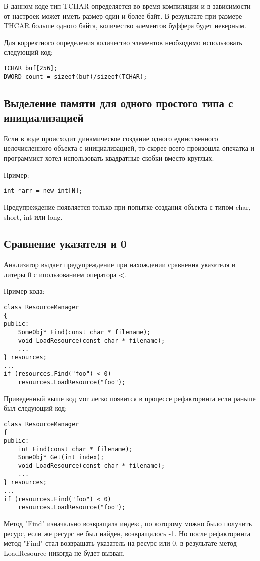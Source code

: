 В данном коде тип TCHAR определяется во время компиляции и в зависимости от настроек
может иметь размер один и более байт. В результате при размере THCAR больше одного байта,
количество элементов буффера будет неверным. 

Для корректного определения количество элементов необходимо использовать следующий код:
\begin{lstlisting}
TCHAR buf[256];
DWORD count = sizeof(buf)/sizeof(TCHAR);
\end{lstlisting}

\subsection{Выделение памяти для одного простого типа с инициализацией}
\label{sec:new}
Если в коде происходит динамическое создание одного единственного целочисленного объекта с
инициализацией, то скорее всего произошла опечатка и программист хотел использовать
квадратные скобки вместо круглых.

Пример:
\begin{lstlisting}
int *arr = new int[N];
\end{lstlisting}

Предупреждение появляется только при попытке создания объекта с типом char, short, int или long.

\subsection{Сравнение указателя и 0}
\label{sec:ptrCmp}
Анализатор выдает предупреждение при нахождении сравнения указателя и литеры 0 с ипользованием 
оператора \textbf{<}.

Пример кода:
\begin{lstlisting}
class ResourceManager
{
public:
	SomeObj* Find(const char * filename);
	void LoadResource(const char * filename);
	...
} resources;
...
if (resources.Find("foo") < 0)
	resources.LoadResource("foo");
\end{lstlisting}
  
Приведенный выше код мог легко появится в процессе рефакторинга если раньше был следующий код: 
\begin{lstlisting}
class ResourceManager
{
public:
	int Find(const char * filename);
	SomeObj* Get(int index);
	void LoadResource(const char * filename);
	...
} resources;
...
if (resources.Find("foo") < 0)
	resources.LoadResource("foo");
\end{lstlisting}
Метод "Find" изначально возвращала индекс, по которому можно было получить ресурс, если же 
ресурс не был найден, возвращалось -1. Но после рефакторинга метод "Find" стал возвращать указатель на 
ресурс или 0, в результате метод LoadResource никогда не будет вызван.

